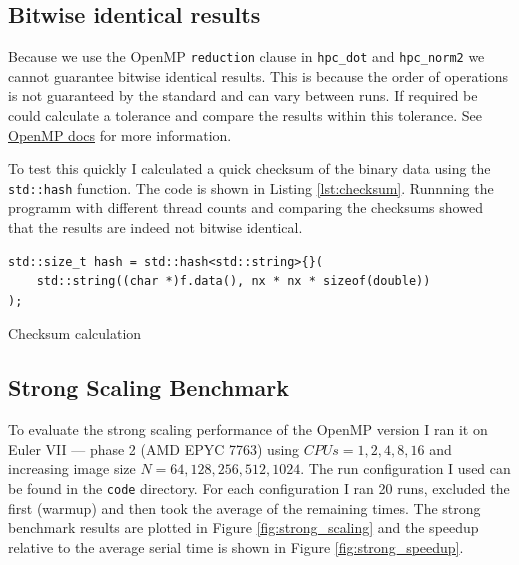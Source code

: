 \documentclass[unicode,11pt,a4paper,oneside,numbers=endperiod,openany]{scrartcl}
\begin{document}
\subsection{Bitwise identical results}

Because we use the OpenMP \texttt{reduction} clause in \texttt{hpc_dot} and \texttt{hpc_norm2} we cannot guarantee bitwise identical results. This is because the order of operations is not guaranteed by the standard and can vary between runs. If required be could calculate a tolerance and compare the results within this tolerance. See \href{https://www.openmp.org/spec-html/5.2/openmpsu50.html}{OpenMP docs} for more information.

To test this quickly I calculated a quick checksum of the binary data using the \texttt{std::hash} function. The code is shown in Listing \ref{lst:checksum}. Runnning the programm with different thread counts and comparing the checksums showed that the results are indeed not bitwise identical.

\begin{listing}[h!t]
    \begin{verbatim}
std::size_t hash = std::hash<std::string>{}(
    std::string((char *)f.data(), nx * nx * sizeof(double))
);
    \end{verbatim}
    \caption{Checksum calculation}
    \label{lst:checksum}
\end{listing}

\subsection{Strong Scaling Benchmark}

To evaluate the strong scaling performance of the OpenMP version I ran it on Euler VII — phase 2 (AMD EPYC 7763) using $CPUs=1,2,4,8,16$ and increasing image size $N=64,128,256,512,1024$. The run configuration I used can be found in the \texttt{code} directory. For each configuration I ran 20 runs, excluded the first (warmup) and then took the average of the remaining times. The strong benchmark results are plotted in Figure \ref{fig:strong_scaling} and the speedup relative to the average serial time is shown in Figure \ref{fig:strong_speedup}.
\end{document}

